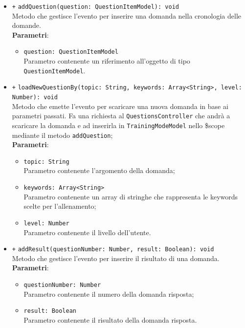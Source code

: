 \begin{itemize}
\begin{itemize}
\begin{itemize}
		\end{itemize}
		\item \texttt{+} \texttt{addQuestion(question: QuestionItemModel): void} \\
		Metodo che gestisce l'evento per inserire una domanda nella cronologia delle domande. \\
		\textbf{Parametri}:
		\begin{itemize}
			\item \texttt{question: QuestionItemModel} \\
			Parametro contenente un riferimento all'oggetto di tipo \texttt{QuestionItemModel}.
		\end{itemize}
		\item \texttt{+} \texttt{loadNewQuestionBy(topic: String, keywords: Array<String>, level:\\ Number): void} \\
		Metodo che emette l'evento per scaricare una nuova domanda in base ai parametri passati. Fa una richiesta al \texttt{QuestionsController} che andrà a scaricare la domanda e ad inserirla in \texttt{TrainingModeModel} nello \$scope mediante il metodo \texttt{addQuestion}; \\
		\textbf{Parametri}:
		\begin{itemize}
			\item \texttt{topic: String} \\
			Parametro contenente l'argomento della domanda;
			\item \texttt{keywords: Array<String>} \\
			Parametro contenente un array di stringhe che rappresenta le keywords scelte per l'allenamento;
			\item \texttt{level: Number} \\
			Parametro contenente il livello dell'utente.
		\end{itemize}
		\item \texttt{+} \texttt{addResult(questionNumber: Number, result: Boolean): void} \\
		Metodo che gestisce l'evento per inserire il risultato di una domanda. \\
		\textbf{Parametri}:
		\begin{itemize}
			\item \texttt{questionNumber: Number} \\
			Parametro contenente il numero della domanda risposta;
			\item \texttt{result: Boolean} \\
			Parametro contenente il risultato della domanda risposta.

\end{itemize}
\end{itemize}
\end{itemize}
